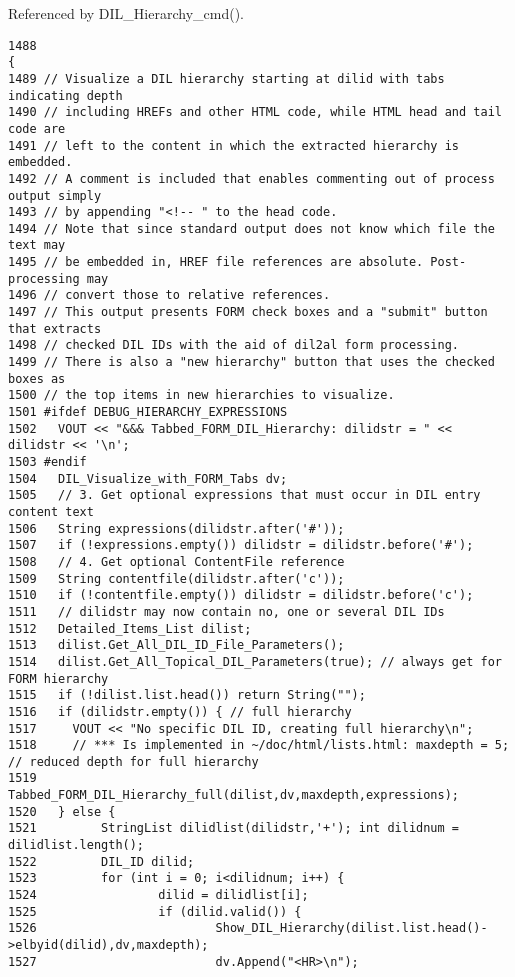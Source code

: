 Referenced by DIL\_\-Hierarchy\_\-cmd().



\footnotesize\begin{verbatim}1488                                                                      {
1489 // Visualize a DIL hierarchy starting at dilid with tabs indicating depth
1490 // including HREFs and other HTML code, while HTML head and tail code are
1491 // left to the content in which the extracted hierarchy is embedded.
1492 // A comment is included that enables commenting out of process output simply
1493 // by appending "<!-- " to the head code.
1494 // Note that since standard output does not know which file the text may
1495 // be embedded in, HREF file references are absolute. Post-processing may
1496 // convert those to relative references.
1497 // This output presents FORM check boxes and a "submit" button that extracts
1498 // checked DIL IDs with the aid of dil2al form processing.
1499 // There is also a "new hierarchy" button that uses the checked boxes as
1500 // the top items in new hierarchies to visualize.
1501 #ifdef DEBUG_HIERARCHY_EXPRESSIONS
1502   VOUT << "&&& Tabbed_FORM_DIL_Hierarchy: dilidstr = " << dilidstr << '\n';
1503 #endif
1504   DIL_Visualize_with_FORM_Tabs dv;
1505   // 3. Get optional expressions that must occur in DIL entry content text
1506   String expressions(dilidstr.after('#'));
1507   if (!expressions.empty()) dilidstr = dilidstr.before('#');
1508   // 4. Get optional ContentFile reference
1509   String contentfile(dilidstr.after('c'));
1510   if (!contentfile.empty()) dilidstr = dilidstr.before('c');
1511   // dilidstr may now contain no, one or several DIL IDs
1512   Detailed_Items_List dilist;
1513   dilist.Get_All_DIL_ID_File_Parameters();
1514   dilist.Get_All_Topical_DIL_Parameters(true); // always get for FORM hierarchy
1515   if (!dilist.list.head()) return String("");
1516   if (dilidstr.empty()) { // full hierarchy
1517     VOUT << "No specific DIL ID, creating full hierarchy\n";
1518     // *** Is implemented in ~/doc/html/lists.html: maxdepth = 5; // reduced depth for full hierarchy
1519     Tabbed_FORM_DIL_Hierarchy_full(dilist,dv,maxdepth,expressions);
1520   } else {
1521         StringList dilidlist(dilidstr,'+'); int dilidnum = dilidlist.length();
1522         DIL_ID dilid;
1523         for (int i = 0; i<dilidnum; i++) {
1524                 dilid = dilidlist[i];
1525                 if (dilid.valid()) {
1526                         Show_DIL_Hierarchy(dilist.list.head()->elbyid(dilid),dv,maxdepth);
1527                         dv.Append("<HR>\n");

\end{verbatim}
